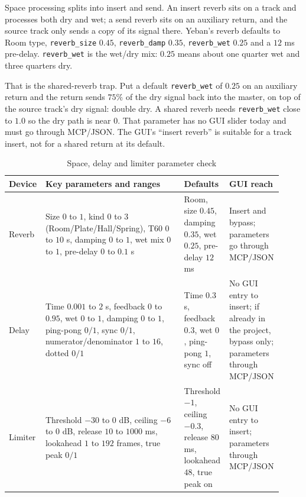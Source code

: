 Space processing splits into insert and send. An insert reverb sits on a track and processes both dry and wet; a send reverb sits on an auxiliary return, and the source track only sends a copy of its signal there. Yeban's reverb defaults to Room type, \texttt{reverb\_size} $0.45$, \texttt{reverb\_damp} $0.35$, \texttt{reverb\_wet} $0.25$ and a $12$ ms pre-delay. \texttt{reverb\_wet} is the wet/dry mix: $0.25$ means about one quarter wet and three quarters dry.

That is the shared-reverb trap. Put a default \texttt{reverb\_wet} of $0.25$ on an auxiliary return and the return sends $75\%$ of the dry signal back into the master, on top of the source track's dry signal: double dry. A shared reverb needs \texttt{reverb\_wet} close to $1.0$ so the dry path is near $0$. That parameter has no GUI slider today and must go through MCP/JSON. The GUI's ``insert reverb'' is suitable for a track insert, not for a shared return at its default.


\begin{table}[htbp]
\centering
\small
\begin{tabular}{@{}p{0.12\linewidth}p{0.50\linewidth}p{0.14\linewidth}p{0.16\linewidth}@{}}
\hline
Device & Key parameters and ranges & Defaults & GUI reach \\
\hline
Reverb & Size $0$ to $1$, kind $0$ to $3$ (Room/Plate/Hall/Spring), T60 $0$ to $10$ s, damping $0$ to $1$, wet mix $0$ to $1$, pre-delay $0$ to $0.1$ s & Room, size $0.45$, damping $0.35$, wet $0.25$, pre-delay $12$ ms & Insert and bypass; parameters go through MCP/JSON \\
Delay & Time $0.001$ to $2$ s, feedback $0$ to $0.95$, wet $0$ to $1$, damping $0$ to $1$, ping-pong $0/1$, sync $0/1$, numerator/denominator $1$ to $16$, dotted $0/1$ & Time $0.3$ s, feedback $0.3$, wet $0$, ping-pong $1$, sync off & No GUI entry to insert; if already in the project, bypass only; parameters through MCP/JSON \\
Limiter & Threshold $-30$ to $0$ dB, ceiling $-6$ to $0$ dB, release $10$ to $1000$ ms, lookahead $1$ to $192$ frames, true peak $0/1$ & Threshold $-1$, ceiling $-0.3$, release $80$ ms, lookahead $48$, true peak on & No GUI entry to insert; parameters through MCP/JSON \\
\hline
\end{tabular}
\caption{Space, delay and limiter parameter check}
\label{tab:walk-space-limiter}
\end{table}

